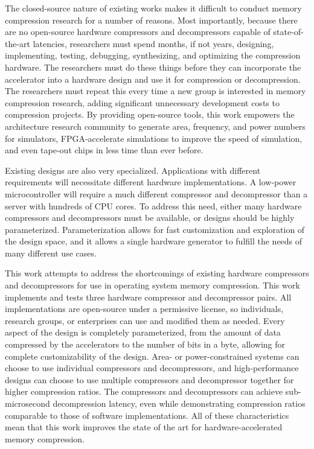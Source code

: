 \documentclass[doublespace,nopageskip]{VTthesis}
\begin{document}
The closed-source nature of existing works makes it difficult to conduct memory compression research for a number of reasons. Most importantly, because there are no open-source hardware compressors and decompressors capable of state-of-the-art latencies, researchers must spend months, if not years, designing, implementing, testing, debugging, synthesizing, and optimizing the compression hardware. The researchers must do these things before they can incorporate the accelerator into a hardware design and use it for compression or decompression. The researchers must repeat this every time a new group is interested in memory compression research, adding significant unnecessary development costs to compression projects. By providing open-source tools, this work empowers the architecture research community to generate area, frequency, and power numbers for simulators, FPGA-accelerate simulations to improve the speed of simulation, and even tape-out chips in less time than ever before.

Existing designs are also very specialized. Applications with different requirements will necessitate different hardware implementations. A low-power microcontroller will require a much different compressor and decompressor than a server with hundreds of CPU cores. To address this need, either many hardware compressors and decompressors must be available, or designs should be highly parameterized. Parameterization allows for fast customization and exploration of the design space, and it allows a single hardware generator to fulfill the needs of many different use cases.

This work attempts to address the shortcomings of existing hardware compressors and decompressors for use in operating system memory compression. This work implements and tests three hardware compressor and decompressor pairs. All implementations are open-source under a permissive license, so individuals, research groups, or enterprises can use and modified them as needed. Every aspect of the design is completely parameterized, from the amount of data compressed by the accelerators to the number of bits in a byte, allowing for complete customizability of the design. Area- or power-constrained systems can choose to use individual compressors and decompressors, and high-performance designs can choose to use multiple compressors and decompressor together for higher compression ratios. The compressors and decompressors can achieve sub-microsecond decompression latency, even while demonstrating compression ratios comparable to those of software implementations. All of these characteristics mean that this work improves the state of the art for hardware-accelerated memory compression.
\end{document}

